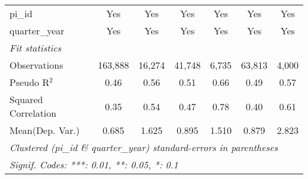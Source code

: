 \begin{tabular}{lcccccc}
   pi\_id                                                     & Yes           & Yes           & Yes           & Yes           & Yes           & Yes\\  
   quarter\_year                                              & Yes           & Yes           & Yes           & Yes           & Yes           & Yes\\  
   \midrule
   \emph{Fit statistics}\\
   Observations                                               & 163,888       & 16,274        & 41,748        & 6,735         & 63,813        & 4,000\\  
   Pseudo R$^2$                                               & 0.46          & 0.56          & 0.51          & 0.66          & 0.49          & 0.57\\  
   Squared Correlation                                        & 0.35          & 0.54          & 0.47          & 0.78          & 0.40          & 0.61\\  
Mean(Dep. Var.) & 0.685 & 1.625 & 0.895 & 1.510 & 0.879 & 2.823 \\
   \midrule \midrule
   \multicolumn{7}{l}{\emph{Clustered (pi\_id \& quarter\_year) standard-errors in parentheses}}\\
   \multicolumn{7}{l}{\emph{Signif. Codes: ***: 0.01, **: 0.05, *: 0.1}}\\
\end{tabular}
\par\endgroup

